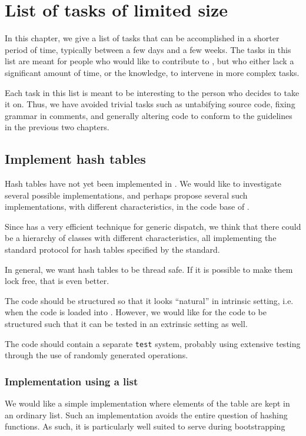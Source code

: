 \chapter{List of tasks of limited size}

In this chapter, we give a list of tasks that can be accomplished in a
shorter period of time, typically between a few days and a few weeks.
The tasks in this list are meant for people who would like to
contribute to \sysname{}, but who either lack a significant amount of
time, or the knowledge, to intervene in more complex tasks.

Each task in this list is meant to be interesting to the person who
decides to take it on.  Thus, we have avoided trivial tasks such as
untabifying source code, fixing grammar in comments, and generally
altering code to conform to the guidelines in the previous two
chapters.

\section{Implement hash tables}

Hash tables have not yet been implemented in \sysname{}.  We would
like to investigate several possible implementations, and perhaps
propose several such implementations, with different characteristics,
in the code base of \sysname{}.

Since \sysname{} has a very efficient technique for generic dispatch,
we think that there could be a hierarchy of classes with different
characteristics, all implementing the standard protocol for hash
tables specified by the \commonlisp{} standard.

In general, we want hash tables to be thread safe.  If it is possible
to make them lock free, that is even better.

The code should be structured so that it looks ``natural'' in
intrinsic setting, i.e. when the code is loaded into \sysname{}.
However, we would like for the code to be structured such that it can
be tested in an extrinsic setting as well.

The code should contain a separate \texttt{test} system, probably using
extensive testing through the use of randomly generated operations.

\subsection{Implementation using a list}

We would like a simple implementation where elements of the table are
kept in an ordinary list.  Such an implementation avoids the entire
question of hashing functions.  As such, it is particularly well
suited to serve during bootstrapping

